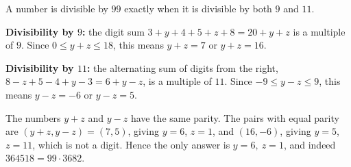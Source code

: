 A number is divisible by $99$ exactly when it is divisible by both $9$ and $11$.

\textbf{Divisibility by $9$:} the digit sum $3+y+4+5+z+8=20+y+z$ is a multiple of $9$. Since $0\le y+z\le18$, this means $y+z=7$ or $y+z=16$.

\textbf{Divisibility by $11$:} the alternating sum of digits from the right, $8-z+5-4+y-3=6+y-z$, is a multiple of $11$. Since $-9\le y-z\le9$, this means $y-z=-6$ or $y-z=5$.

The numbers $y+z$ and $y-z$ have the same parity. The pairs with equal parity are $(y+z,y-z)=(7,5)$, giving $y=6$, $z=1$, and $(16,-6)$, giving $y=5$, $z=11$, which is not a digit. Hence the only answer is $\boxed{y=6,\ z=1}$, and indeed $364518=99\cdot3682$.
